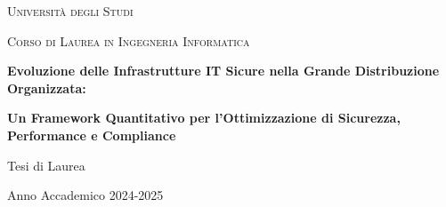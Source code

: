 \documentclass[12pt,a4paper,twoside]{book}
\begin{document}
\begin{titlepage}
    \centering
    \vspace*{2cm}
    {\scshape\LARGE Università degli Studi\par}
    \vspace{1cm}
    {\scshape\Large Corso di Laurea in Ingegneria Informatica\par}
    \vspace{1.5cm}
    {\huge\bfseries Evoluzione delle Infrastrutture IT Sicure nella Grande Distribuzione Organizzata:\par}
    \vspace{0.5cm}
    {\Large\bfseries Un Framework Quantitativo per l'Ottimizzazione di Sicurezza, Performance e Compliance\par}
    \vfill
    {\Large Tesi di Laurea\par}
    \vfill
    {\large Anno Accademico 2024-2025\par}
\end{titlepage}


% 

%
% 
% 
% 


% 


%
% 

%
%
%
%
%
%
%
%
%
%
%
\printbibliography[heading=bibintoc,title={Bibliografia}]
\printbibliography[
  heading=subbibliography,
  title={Bibliografia del Capitolo},
  segment=\therefsegment,
  nottype=online  %
]

\printbibliography[
  heading=subbibliography,
  title={Sitografia del Capitolo},
  segment=\therefsegment,
  type=online
]
\end{document}

